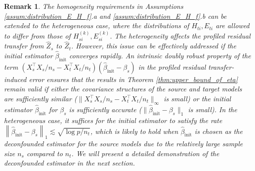 \documentclass[12pt]{article}
\newtheorem{remark}{Remark}
\begin{document}
\begin{remark}
The homogeneity requirements in Assumptions \ref{assum:distribution_E_H_f}.a and \ref{assum:distribution_E_H_f}.b can be extended to the heterogeneous case, where the distributions of $H_{ti},E_{ti}$ are allowed to differ from those of $H_{si}^{(k)},E_{si}^{(k)}$. The heterogeneity affects the profiled residual transfer from $\hat{Z}_s$ to $\hat{Z}_t$. However, this issue can be effectively addressed if the initial estimator $\hat{\beta}_{\text{init}}$ converges rapidly. An intrinsic doubly robust property of the term $(X_s^\top X_s/n_s - X_t^\top X_t/n_t)(\hat{\beta}_{\text{init}} -\beta_s)$ in the profiled residual transfer-induced error ensures that the results in Theorem \ref{thm:upper_bound_of_eta} remain valid if either the covariance structures of the source and target models are sufficiently similar ($\|X_s^\top X_s/n_s - X_t^\top X_t/n_t\|_{\infty}$ is small) or the initial estimator $\hat{\beta}_{\text{init}}$ for $\beta_s$ is sufficiently accurate ($\|\hat{\beta}_{\text{init}} -\beta_s\|_1$ is small).  In the heterogeneous case, it suffices for the initial estimator to satisfy the rate $\left\|\hat{\beta}_{\text{init}}-\beta_s\right\|_1\lesssim \sqrt{\log p/n_t}$, which is likely to hold when $\hat{\beta}_{\text{init}}$ is chosen as the deconfounded estimator for the source models due to the relatively large sample size $n_s$ compared to $n_t$. We will present a detailed demonstration of the deconfounded estimator in the next section.
\end{remark}
\end{document}
